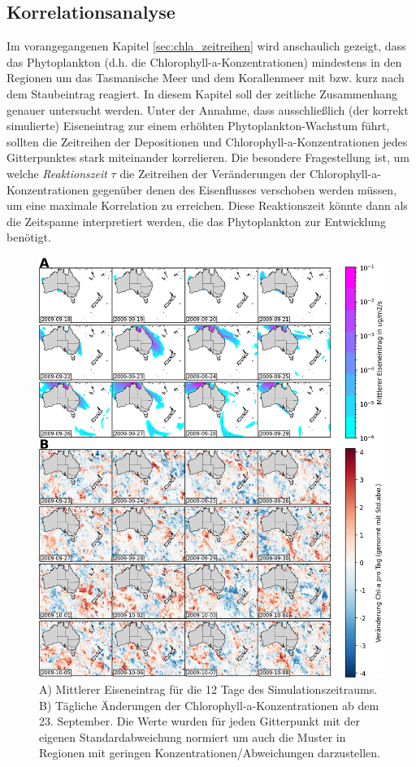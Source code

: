 \documentclass[12pt,a4paper,onecolumn,draft]{scrartcl}
\begin{document}
\subsection{Korrelationsanalyse} \label{sec:correlation_analysis}
Im vorangegangenen Kapitel \ref{sec:chla_zeitreihen} wird anschaulich gezeigt, dass das Phytoplankton (d.h. die Chlorophyll-a-Konzentrationen) mindestens in den Regionen um das Tasmanische Meer und dem Korallenmeer mit bzw. kurz nach dem Staubeintrag reagiert. In diesem Kapitel soll der zeitliche Zusammenhang genauer untersucht werden. Unter der Annahme, dass ausschließlich (der korrekt simulierte) Eiseneintrag zur einem erhöhten Phytoplankton-Wachstum führt, sollten die Zeitreihen der Depositionen und Chlorophyll-a-Konzentrationen jedes Gitterpunktes stark miteinander korrelieren. Die besondere Fragestellung ist, um welche \textit{Reaktionszeit} $\tau$ die Zeitreihen der Veränderungen der Chlorophyll-a-Konzentrationen gegenüber denen des Eisenflusses verschoben werden müssen, um eine maximale Korrelation zu erreichen. Diese Reaktionszeit könnte dann als die Zeitspanne interpretiert werden, die das Phytoplankton zur Entwicklung benötigt.
\begin{figure}
\includegraphics[width=\textwidth]{bilder/snapshot_normalized.png}
\caption{A) Mittlerer Eiseneintrag für die 12 Tage des Simulationszeitraums. B) Tägliche Änderungen der Chlorophyll-a-Konzentrationen ab dem 23. September. Die Werte wurden für jeden Gitterpunkt mit der eigenen Standardabweichung normiert um auch die Muster in Regionen mit geringen Konzentrationen/Abweichungen darzustellen.} \label{fig:snapshot_fedep_chla}
\end{figure}
\end{document}
